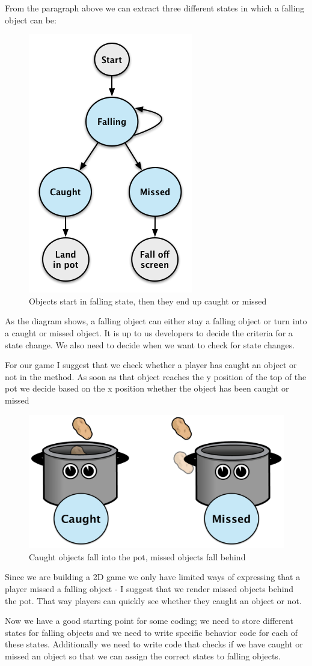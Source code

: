 From the paragraph above we can extract three different states in which a
falling object can be:
\begin{figure}[H]
		\centering
		\includegraphics[width=0.3\linewidth]{images/Chapter3/falling_object_states.png}
		\caption{Objects start in falling state, then they end up caught or missed}
\end{figure}
As the diagram shows, a falling object can either stay a falling object or turn
into a caught or missed object. It is up to us developers to decide the criteria
for a state change. We also need to decide when we want to check for state
changes.

For our game I suggest that we check whether a player has caught an object or
not in the  method. As soon as that object reaches the y
position of the top of the pot we decide based on the x position whether the
object has been caught or missed 
\begin{figure}[H]
		\centering
		\includegraphics[width=0.3\linewidth]{images/Chapter3/catch_test.png}
		\caption{Caught objects fall into the pot, missed objects fall behind}
		\label{CaughtMissedDefinition}
\end{figure}
Since we are building a 2D game we only have limited ways of expressing that a
player missed a falling object - I suggest that we render missed objects behind
the pot. That way players can quickly see whether they caught an object or not.

Now we have a good starting point for some coding; we need to store
different states for falling objects and we need to write specific behavior
code for each of these states. Additionally we need to write code that checks if
we have caught or missed an object so that we can assign the correct states to
falling objects.

